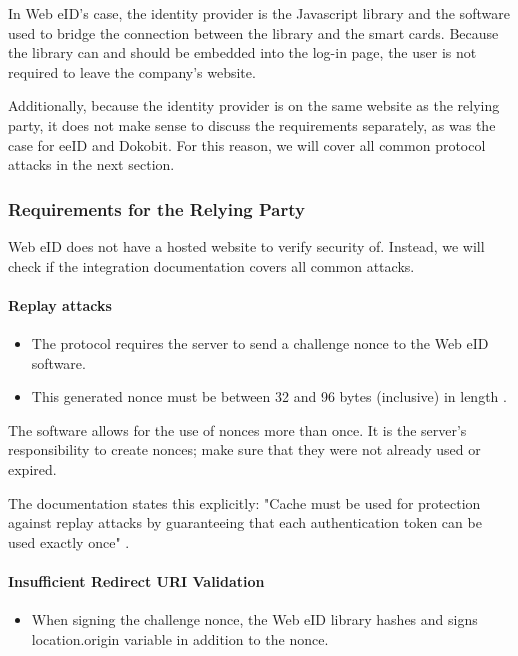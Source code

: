 In Web eID's case, the identity provider is the Javascript library and the software used to bridge the connection between the library and the smart cards. Because the library can and should be embedded into the log-in page, the user is not required to leave the company's website.

Additionally, because the identity provider is on the same website as the relying party, it does not make sense to discuss the requirements separately, as was the case for eeID and Dokobit. For this reason, we will cover all common protocol attacks in the next section.

\subsubsection{Requirements for the Relying Party}

Web eID does not have a hosted website to verify security of. Instead, we will check if the integration documentation covers all common attacks.

\paragraph{Replay attacks}

\begin{itemize}
  \item The protocol requires the server to send a challenge nonce to the Web eID software.
  \item This generated nonce must be between 32 and 96 bytes (inclusive) in length \cite{ria-webeid-source-web-eid-app-authenticate}.
\end{itemize}

The software allows for the use of nonces more than once. It is the server's responsibility to create nonces; make sure that they were not already used or expired.

The documentation states this explicitly: "Cache must be used for protection against replay attacks by guaranteeing that each authentication token can be used exactly once" \cite{ria-webeid-source-web-eid-authtoken-validation-java-readme}.

\paragraph{Insufficient Redirect URI Validation}

\begin{itemize}
  \item When signing the challenge nonce, the Web eID library hashes and signs {location.origin} variable in addition to the nonce.
\end{itemize}

